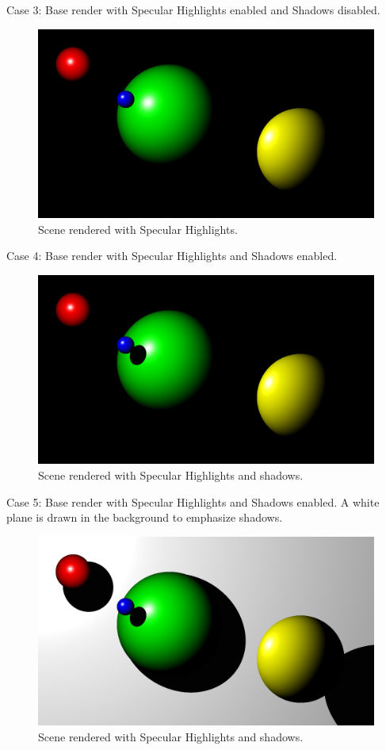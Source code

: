 \documentclass{article}
\begin{document}
Case 3: Base render with Specular Highlights enabled and Shadows disabled.
\begin{figure}[H]
  \includegraphics[width=\linewidth]{three.png}
  \caption{Scene rendered with Specular Highlights.}
  \label{fig:case3}
\end{figure}


Case 4: Base render with Specular Highlights and Shadows enabled.
\begin{figure}[H]
  \includegraphics[width=\linewidth]{four.png}
  \caption{Scene rendered with Specular Highlights and shadows.}
  \label{fig:case4}
\end{figure}

Case 5: Base render with Specular Highlights and Shadows enabled. A white plane is drawn in the background to emphasize shadows.
\begin{figure}[H]
  \includegraphics[width=\linewidth]{five.png}
  \caption{Scene rendered with Specular Highlights and shadows.}
  \label{fig:case5}
\end{figure}
\end{document}
